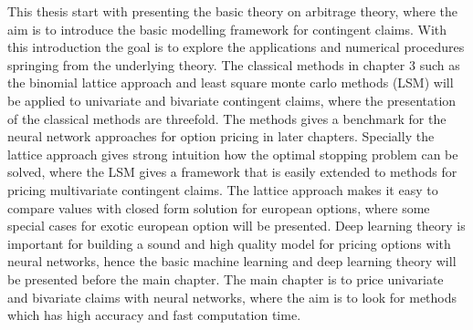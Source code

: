 This thesis start with presenting the basic theory on arbitrage theory, where the aim is to introduce the basic modelling framework for contingent claims. With this introduction the goal is to explore the applications and numerical procedures springing from the underlying theory. The classical methods in chapter 3 such as the binomial lattice approach and least square monte carlo methods (LSM) will be applied to univariate and bivariate contingent claims, where the presentation of the classical methods are threefold. The methods gives a benchmark for the neural network approaches for option pricing in later chapters. Specially the lattice approach gives strong intuition how the optimal stopping problem can be solved, where the LSM gives a framework that is easily extended to methods for pricing multivariate contingent claims. The lattice approach makes it easy to compare values with closed form solution for european options, where some special cases for exotic european option will be presented. Deep learning theory is important for building a sound and high quality model for pricing options with neural networks, hence the basic machine learning and deep learning theory will be presented before the main chapter. The main chapter is to price univariate and bivariate claims with neural networks, where the aim is to look for methods which has high accuracy and fast computation time. 


